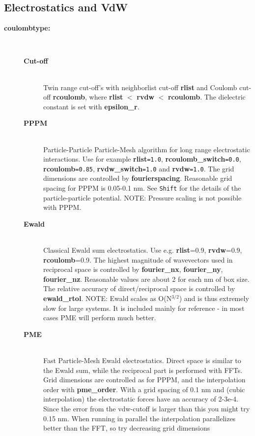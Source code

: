 \subsection{ Electrostatics and VdW}
\begin{description}
\item[{\bf coulombtype:}]\mbox{}\\
\vspace{-2ex}\begin{description}
\item[{\bf Cut-off}]\mbox{}\\
Twin range cut-off's with neighborlist cut-off {\bf rlist} and 
Coulomb cut-off {\bf rcoulomb},
where {\bf rlist} {\tt $<$} {\bf rvdw} {\tt $<$} {\bf rcoulomb}.
The dielectric constant is set with {\bf epsilon\_r}.
\item[{\bf PPPM}]\mbox{}\\
Particle-Particle Particle-Mesh algorithm for long range
electrostatic interactions.
Use for example {\bf rlist}{\tt =1.0}, {\bf rcoulomb\_switch}{\tt =0.0},
{\bf rcoulomb}{\tt =0.85}, {\bf rvdw\_switch}{\tt =1.0}
and {\bf rvdw}{\tt =1.0}. The grid
dimensions are controlled by {\bf fourierspacing}.
Reasonable grid spacing for PPPM is 0.05-0.1 nm.
See {\tt Shift} for the details of the particle-particle potential.
NOTE: Pressure scaling is not possible with PPPM.
\item[{\bf Ewald}]\mbox{}\\
Classical Ewald sum electrostatics. Use e.g. {\bf rlist}=0.9,
{\bf rvdw}=0.9, {\bf rcoulomb}=0.9. The highest magnitude of
wavevectors used in reciprocal space is controlled by
{\bf fourier\_nx}, {\bf fourier\_ny}, {\bf fourier\_nz}. Reasonable
values are about 2 for each nm of box size. The relative accuracy of direct/reciprocal space
is controlled by {\bf ewald\_rtol}. NOTE: Ewald scales as O(N$^{3/2}$) and
is thus extremely slow for large systems. It is included mainly for
reference - in most cases PME will perform much better.
\item[{\bf PME} ]\mbox{}\\
Fast Particle-Mesh Ewald electrostatics. Direct space is similar
to the Ewald sum, while the reciprocal part is performed with
FFTs. Grid dimensions are controlled as for PPPM, and the
interpolation order with {\bf pme\_order}. With a grid spacing of 0.1
nm and (cubic interpolation) the electrostatic forces have an accuracy
of 2-3e-4. Since the error from the vdw-cutoff is larger than this you
might try 0.15 nm. When running in parallel the interpolation
parallelizes better than the FFT, so try decreasing grid dimensions

\end{description}
\end{description}
